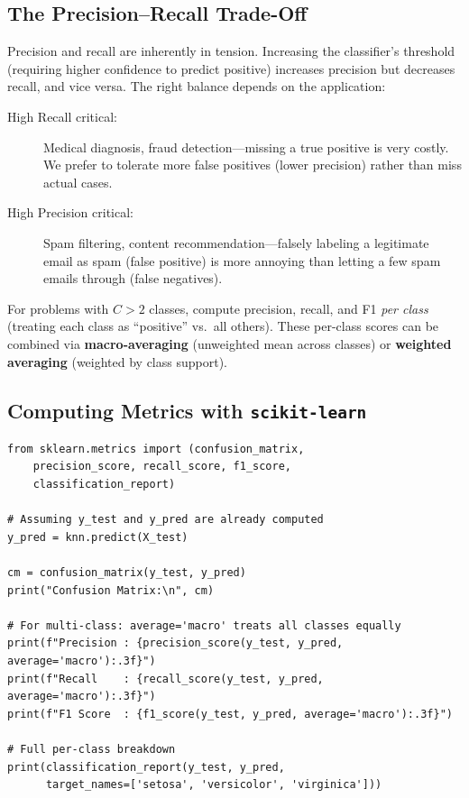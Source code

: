 \subsection*{The Precision--Recall Trade-Off}

Precision and recall are inherently in tension. Increasing the classifier's threshold (requiring higher confidence to predict positive) increases precision but decreases recall, and vice versa. The right balance depends on the application:

\begin{description}
    \item[High Recall critical:] Medical diagnosis, fraud detection---missing a true positive is very costly. We prefer to tolerate more false positives (lower precision) rather than miss actual cases.
    \item[High Precision critical:] Spam filtering, content recommendation---falsely labeling a legitimate email as spam (false positive) is more annoying than letting a few spam emails through (false negatives).
\end{description}

\begin{remark}
For problems with $C > 2$ classes, compute precision, recall, and F1 \textit{per class} (treating each class as ``positive'' vs.\ all others). These per-class scores can be combined via \textbf{macro-averaging} (unweighted mean across classes) or \textbf{weighted averaging} (weighted by class support).
\end{remark}

\subsection*{Computing Metrics with \texttt{scikit-learn}}

\begin{lstlisting}[style=pythonstyle]
from sklearn.metrics import (confusion_matrix,
    precision_score, recall_score, f1_score,
    classification_report)

# Assuming y_test and y_pred are already computed
y_pred = knn.predict(X_test)

cm = confusion_matrix(y_test, y_pred)
print("Confusion Matrix:\n", cm)

# For multi-class: average='macro' treats all classes equally
print(f"Precision : {precision_score(y_test, y_pred, average='macro'):.3f}")
print(f"Recall    : {recall_score(y_test, y_pred, average='macro'):.3f}")
print(f"F1 Score  : {f1_score(y_test, y_pred, average='macro'):.3f}")

# Full per-class breakdown
print(classification_report(y_test, y_pred,
      target_names=['setosa', 'versicolor', 'virginica']))
\end{lstlisting}

